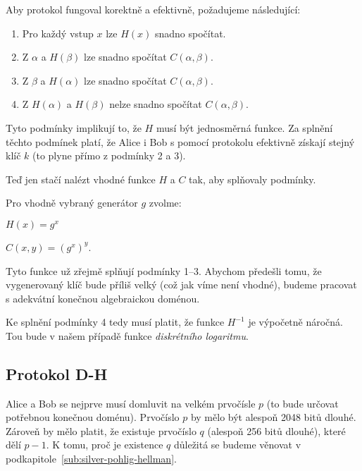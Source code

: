 \documentclass[
  program=infoi,
  biblatex,
  figures=false,
  glossaries,
  index
]{kidiplom}
\begin{document}
    Aby protokol fungoval korektně a efektivně, požadujeme následující:

    \begin{enumerate}
        \item
            Pro každý vstup $x$ lze $H(x)$ snadno spočítat.
        \item
            Z $\alpha$ a $H(\beta)$ lze snadno spočítat $C(\alpha,\beta)$.
        \item
            Z $\beta$ a $H(\alpha)$ lze snadno spočítat $C(\alpha,\beta)$.
        \item
            Z $H(\alpha)$ a $H(\beta)$ nelze snadno spočítat $C(\alpha,\beta)$.
    \end{enumerate}

    Tyto podmínky implikují to, že $H$ musí být jednosměrná funkce.
    Za splnění těchto podmínek platí, že Alice i Bob s pomocí protokolu efektivně získají
    stejný klíč $k$ (to plyne přímo z podmínky 2 a 3).

    \medskip

    Teď jen stačí nalézt vhodné funkce $H$ a $C$ tak, aby splňovaly podmínky.

    \medskip

    Pro vhodně vybraný generátor $g$ zvolme:

    \begin{center}
        $H(x) = g^x$

        $C(x, y) = (g^x)^y$.

        \medskip
    \end{center}

    Tyto funkce už zřejmě splňují podmínky 1--3. Abychom předešli tomu, že vygenerovaný klíč bude příliš velký
    (což jak víme není vhodné), budeme pracovat s adekvátní konečnou algebraickou doménou.

    Ke splnění podmínky 4 tedy musí platit, že funkce $H^{-1}$ je výpočetně náročná.
    Tou bude v našem případě funkce \emph{diskrétního logaritmu}.


    \subsection{Protokol D-H}

        Alice a Bob se nejprve musí domluvit na velkém prvočísle $p$ (to bude určovat potřebnou konečnou doménu).
        Prvočíslo $p$ by mělo být alespoň 2048 bitů dlouhé.
        Zároveň by mělo platit, že existuje prvočíslo $q$ (alespoň 256 bitů dlouhé), které dělí $p-1$.
        K tomu, proč je existence $q$ důležitá se budeme věnovat v podkapitole~\ref{sub:silver-pohlig-hellman}.
\end{document}
